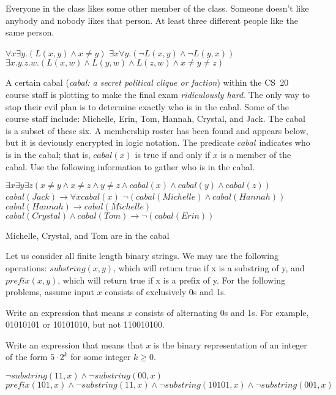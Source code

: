 \documentclass[solution, letterpaper]{cs20inclass}
\begin{document}
\subproblem Everyone in the class likes some other member of the class.
\subproblem Someone doesn't like anybody and nobody likes that person.
\subproblem At least three different people like the same person.

\begin{solution}

\subsolution $\forall x \exists y . (L(x,y) \wedge x \neq y)$
\subsolution $\exists x \forall y . (\lnot L(x,y) \wedge \lnot L(y,x))$
\subsolution $\exists x. y. z. w. (L(x,w) \land L(y,w) \land L(z,w) \land x \neq y \neq z)$

\end{solution}

\problem A certain cabal (\emph{cabal: a secret political clique or faction})
 within the CS~20 course staff is
plotting to make the final exam \emph{ridiculously hard}. The only way to stop their evil plan is to determine exactly who is in the cabal. Some of the course staff include: Michelle, Erin, Tom, Hannah, Crystal, and Jack. The cabal is a subset of these six. A membership roster has been found and appears below, but it is deviously encrypted in logic notation. The predicate $cabal$ indicates who is in the cabal; that is, $cabal(x)$ is true if and only if $x$ is a member of the cabal. Use the following information to gather who is in the cabal. 

\subproblem $\exists x \exists y \exists z (x \neq y \land x \neq z \land y \neq z \land cabal(x) \land cabal(y) \land cabal(z))$
\subproblem $cabal(Jack) \rightarrow \forall x cabal(x)$
\subproblem $\lnot (cabal(Michelle) \land cabal(Hannah))$
\subproblem $cabal(Hannah) \rightarrow cabal(Michelle)$
\subproblem $cabal(Crystal) \land cabal(Tom) \rightarrow \lnot(cabal(Erin))$

\begin{solution}
Michelle, Crystal, and Tom are in the cabal
\end{solution}

\problem Let us consider all finite length binary strings. We may use the following operations: $substring(x,y)$, which will return true if x is a substring of y, and $prefix(x,y)$, which will return true if x is a prefix of y. For the following problems, assume input $x$ consists of exclusively 0s and 1s. 

\subproblem Write an expression that means $x$ consists of alternating 0s and 1s. For example, 01010101 or 10101010, but not 110010100. 

\subproblem Write an expression that means that $x$ is the binary representation of an integer of the form $5 \cdot 2^k$ for some integer $k \geq 0$. 

\begin{solution}
\subsolution $\lnot substring(11, x) \land \lnot substring(00,x)$
\subsolution $ prefix(101, x) \land \lnot substring(11, x) \land \lnot substring(10101, x) \land \lnot substring(001,x)$

\end{solution}
\end{document}
